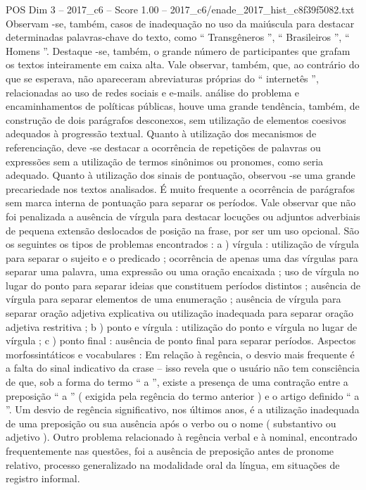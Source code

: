 \begin{textsample}{POS Dim 3 – 2017\_c6 – Score 1.00 – 2017\_c6/enade\_2017\_hist\_c8f39f5082.txt}
Observam -se, também, casos de inadequação no uso da maiúscula para destacar determinadas palavras-chave do texto, como “ Transgêneros ”, “ Brasileiros ”, “ Homens ”.
Destaque -se, também, o grande número de participantes que grafam os textos inteiramente em caixa alta.
Vale observar, também, que, ao contrário do que se esperava, não apareceram abreviaturas próprias do “ internetês ”, relacionadas ao uso de redes sociais e e-mails. análise do problema e encaminhamentos de políticas públicas, houve uma grande tendência, também, de construção de dois parágrafos desconexos, sem utilização de elementos coesivos adequados à progressão textual.
Quanto à utilização dos mecanismos de referenciação, deve -se destacar a ocorrência de repetições de palavras ou expressões sem a utilização de termos sinônimos ou pronomes, como seria adequado.
Quanto à utilização dos sinais de pontuação, observou -se uma grande precariedade nos textos analisados.
É muito frequente a ocorrência de parágrafos sem marca interna de pontuação para separar os períodos.
Vale observar que não foi penalizada a ausência de vírgula para destacar locuções ou adjuntos adverbiais de pequena extensão deslocados de posição na frase, por ser um uso opcional.
São os seguintes os tipos de problemas encontrados : a ) vírgula : utilização de vírgula para separar o sujeito e o predicado ; ocorrência de apenas uma das vírgulas para separar uma palavra, uma expressão ou uma oração encaixada ; uso de vírgula no lugar do ponto para separar ideias que constituem períodos distintos ; ausência de vírgula para separar elementos de uma enumeração ; ausência de vírgula para separar oração adjetiva explicativa ou utilização inadequada para separar oração adjetiva restritiva ; b ) ponto e vírgula : utilização do ponto e vírgula no lugar de vírgula ; c ) ponto final : ausência de ponto final para separar períodos.
Aspectos morfossintáticos e vocabulares : Em relação à regência, o desvio mais frequente é a falta do sinal indicativo da crase – isso revela que o usuário não tem consciência de que, sob a forma do termo “ a ”, existe a presença de uma contração entre a preposição “ a ” ( exigida pela regência do termo anterior ) e o artigo definido “ a ”.
Um desvio de regência significativo, nos últimos anos, é a utilização inadequada de uma preposição ou sua ausência após o verbo ou o nome ( substantivo ou adjetivo ).
Outro problema relacionado à regência verbal e à nominal, encontrado frequentemente nas questões, foi a ausência de preposição antes de pronome relativo, processo generalizado na modalidade oral da língua, em situações de registro informal.

\end{textsample}
